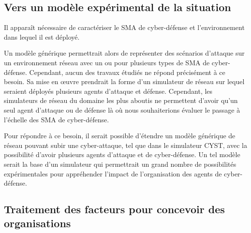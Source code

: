\documentclass[conference]{IEEEtran}
\begin{document}
\subsection{Vers un modèle expérimental de la situation}

Il apparaît nécessaire de caractériser le SMA de cyber-défense
et l'environnement dans lequel il est déployé.%

Un  modèle générique  permettrait alors de représenter des scénarios d'attaque sur un environnement réseau avec un ou pour plusieurs types de SMA de cyber-défense. Cependant, aucun des travaux étudiés ne répond précisément à ce besoin. Sa mise en œuvre prendrait la forme d'un simulateur de réseau sur lequel seraient déployés plusieurs agents d'attaque et défense. Cependant, les simulateurs de réseau du domaine les plus aboutis ne permettent d'avoir qu'un seul agent d'attaque ou de défense là où nous souhaiterions évaluer le passage à l'échelle des SMA de cyber-défense.




Pour répondre à ce besoin, il serait possible d'étendre un modèle générique de réseau pouvant subir une cyber-attaque, tel que dans le simulateur CYST\cite{drasar_session-level_2020},
avec la possibilité d'avoir plusieurs agents d'attaque et de cyber-défense. Un tel modèle serait la base d'un simulateur qui permettrait un grand nombre de possibilités expérimentales pour appréhender l'impact de l'organisation des agents de cyber-défense.


\subsection{Traitement des facteurs pour concevoir des organisations}
\end{document}
